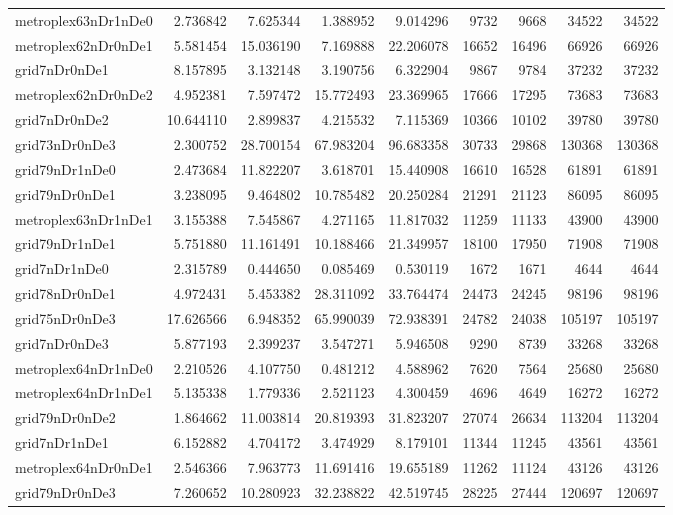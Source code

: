 \begin{longtable}{|l|r|r|r|r|r|r|r|r|}
metroplex63nDr1nDe0 & 2.736842 & 7.625344 & 1.388952 & 9.014296 & 9732 & 9668 & 34522 & 34522 \\
metroplex62nDr0nDe1 & 5.581454 & 15.036190 & 7.169888 & 22.206078 & 16652 & 16496 & 66926 & 66926 \\
grid7nDr0nDe1 & 8.157895 & 3.132148 & 3.190756 & 6.322904 & 9867 & 9784 & 37232 & 37232 \\
metroplex62nDr0nDe2 & 4.952381 & 7.597472 & 15.772493 & 23.369965 & 17666 & 17295 & 73683 & 73683 \\
grid7nDr0nDe2 & 10.644110 & 2.899837 & 4.215532 & 7.115369 & 10366 & 10102 & 39780 & 39780 \\
grid73nDr0nDe3 & 2.300752 & 28.700154 & 67.983204 & 96.683358 & 30733 & 29868 & 130368 & 130368 \\
grid79nDr1nDe0 & 2.473684 & 11.822207 & 3.618701 & 15.440908 & 16610 & 16528 & 61891 & 61891 \\
grid79nDr0nDe1 & 3.238095 & 9.464802 & 10.785482 & 20.250284 & 21291 & 21123 & 86095 & 86095 \\
metroplex63nDr1nDe1 & 3.155388 & 7.545867 & 4.271165 & 11.817032 & 11259 & 11133 & 43900 & 43900 \\
grid79nDr1nDe1 & 5.751880 & 11.161491 & 10.188466 & 21.349957 & 18100 & 17950 & 71908 & 71908 \\
grid7nDr1nDe0 & 2.315789 & 0.444650 & 0.085469 & 0.530119 & 1672 & 1671 & 4644 & 4644 \\
grid78nDr0nDe1 & 4.972431 & 5.453382 & 28.311092 & 33.764474 & 24473 & 24245 & 98196 & 98196 \\
grid75nDr0nDe3 & 17.626566 & 6.948352 & 65.990039 & 72.938391 & 24782 & 24038 & 105197 & 105197 \\
grid7nDr0nDe3 & 5.877193 & 2.399237 & 3.547271 & 5.946508 & 9290 & 8739 & 33268 & 33268 \\
metroplex64nDr1nDe0 & 2.210526 & 4.107750 & 0.481212 & 4.588962 & 7620 & 7564 & 25680 & 25680 \\
metroplex64nDr1nDe1 & 5.135338 & 1.779336 & 2.521123 & 4.300459 & 4696 & 4649 & 16272 & 16272 \\
grid79nDr0nDe2 & 1.864662 & 11.003814 & 20.819393 & 31.823207 & 27074 & 26634 & 113204 & 113204 \\
grid7nDr1nDe1 & 6.152882 & 4.704172 & 3.474929 & 8.179101 & 11344 & 11245 & 43561 & 43561 \\
metroplex64nDr0nDe1 & 2.546366 & 7.963773 & 11.691416 & 19.655189 & 11262 & 11124 & 43126 & 43126 \\
grid79nDr0nDe3 & 7.260652 & 10.280923 & 32.238822 & 42.519745 & 28225 & 27444 & 120697 & 120697 \\

\end{longtable}
